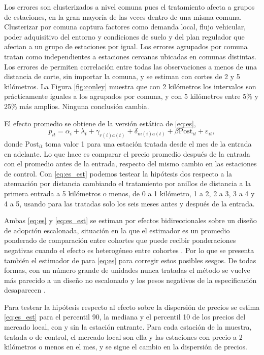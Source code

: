 Los errores son clusterizados a nivel comuna pues el tratamiento afecta a grupos de estaciones, en la gran mayoría de las veces dentro de una misma comuna. Clusterizar por comuna captura factores como demanda local, flujo vehicular, poder adquisitivo del entorno y condiciones de suelo y del plan regulador que afectan a un grupo de estaciones por igual. Los errores agrupados por comuna tratan como independientes a estaciones cercanas ubicadas en comunas distintas. Los errores de \textcite{CONLEY1991} permiten correlación entre todas las observaciones a menos de una distancia de corte, sin importar la comuna, y se estiman con cortes de 2 y 5 kilómetros. La Figura \ref{fig:conley} muestra que con 2 kilómetros los intervalos son prácticamente iguales a los agrupados por comuna, y con 5 kilómetros entre 5\% y 25\% más amplios. Ninguna conclusión cambia.

El efecto promedio se obtiene de la versión estática de \eqref{eq:es}, 
\begin{equation}
    p_{it} = \alpha_i + \lambda_t + \gamma_{r(i)a(t)} + \delta_{m(i)a(t)} + \beta \text{Post}_{it} + \varepsilon_{it}, 
    \label{eq:es_est}
\end{equation}
donde $\text{Post}_{it}$ toma valor 1 para una estación tratada desde el mes de la entrada en adelante. Lo que hace es comparar el precio promedio después de la entrada con el promedio antes de la entrada, respecto del mismo cambio en las estaciones de control. Con \eqref{eq:es_est} podemos testear la hipótesis dos respecto a la atenuación por distancia cambiando el tratamiento por anillos de distancia a la primera entrada a 5 kilómetros o menos, de 0 a 1 kilómetro, 1 a 2, 2 a 3, 3 a 4 y 4 a 5, usando para las tratadas solo los seis meses antes y después de la entrada.

Ambas \eqref{eq:es} y \eqref{eq:es_est} se estiman por efectos bidireccionales sobre un diseño de adopción escalonada, situación en la que el estimador es un promedio ponderado de comparación entre cohortes que puede recibir ponderaciones negativas cuando el efecto es heterogéneo entre cohortes \parencite{BORUSYAK2024,CALLAWAYSANTANNA2021,SUNABRAHAM2021}. Por lo que se presenta también el estimador de \textcite{SUNABRAHAM2021} para \eqref{eq:es} para corregir estos posibles sesgos. De todas formas, con un número grande de unidades nunca tratadas el método se vuelve más parecido a un diseño no escalonado y los pesos negativos de la especificación desaparecen \parencite{BORUSYAK2024}.

Para testear la hipótesis respecto al efecto sobre la dispersión de precios se estima \eqref{eq:es_est} para el percentil 90, la mediana y el percentil 10 de los precios del mercado local, con y sin la estación entrante. Para cada estación de la muestra, tratada o de control, el mercado local son ella y las estaciones con precio a 2 kilómetros o menos en el mes, y se sigue el cambio en la dispersión de precios.

